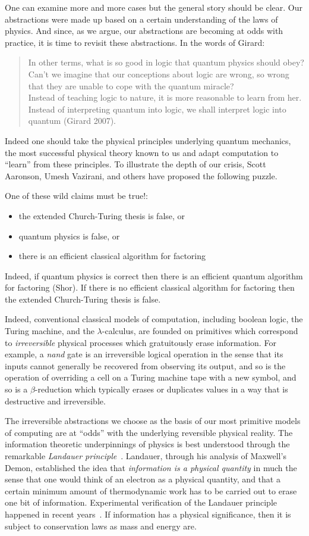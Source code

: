 \documentclass{article}
\begin{document}
One can examine more and more cases but the general story should be
clear. Our abstractions were made up based on a certain understanding of the
laws of physics. And since, as we argue, our abstractions are becoming at
odds with practice, it is time to revisit these abstractions. In the words of
Girard:
\begin{quote}
  In other terms, what is so good in logic that quantum physics should obey?
  Can't we imagine that our conceptions about logic are wrong, so wrong that
  they are unable to cope with the quantum miracle? 
  \\
  Instead of teaching logic to nature, it is more reasonable to learn
  from her. Instead of interpreting quantum into logic, we shall
  interpret logic into quantum (Girard 2007).
\end{quote}
Indeed one should take the physical principles underlying quantum mechanics,
the most successful physical theory known to us and adapt computation to
``learn'' from these principles. To illustrate the depth of our crisis, Scott
Aaronson, Umesh Vazirani, and others have proposed the following puzzle. 

One of these wild claims must be true!:
\begin{itemize}
\item the extended Church-Turing thesis is false, or
\item quantum physics is false, or
\item there is an efficient classical algorithm for factoring
\end{itemize} 
Indeed, if quantum physics is correct then there is an efficient quantum
algorithm for factoring (Shor). If there is no efficient classical algorithm
for factoring then the extended Church-Turing thesis is false. 

Indeed, conventional classical models of computation, including boolean
logic, the Turing machine, and the $\lambda$-calculus, are founded on
primitives which correspond to \emph{irreversible} physical processes which
gratuitously erase information.  For example, a \emph{nand} gate is an
irreversible logical operation in the sense that its inputs cannot generally
be recovered from observing its output, and so is the operation of overriding
a cell on a Turing machine tape with a new symbol, and so is a
$\beta$-reduction which typically erases or duplicates values in a way that
is destructive and irreversible.

The irreversible abstractions we choose as the basis of our most
primitive models of computing are at ``odds'' with the underlying
reversible physical reality. The information theoretic underpinnings
of physics is best understood through the remarkable \emph{Landauer
  principle}~\cite{Landauer:1961}. Landauer, through his analysis of
Maxwell's Demon, established the idea that \emph{information is a
  physical quantity} in much the sense that one would think of an
electron as a physical quantity, and that a certain minimum amount of
thermodynamic work has to be carried out to erase one bit of
information. Experimental verification of the Landauer principle
happened in recent years~\cite{berut2012experimental}. If information
has a physical significance, then it is subject to conservation laws
as mass and energy are. 
\end{document}
